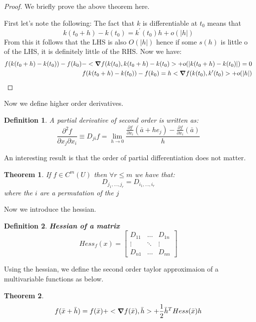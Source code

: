 \documentclass[titlepage]{article}
\newtheorem{theorem}{Theorem}[section]
\newtheorem{definition}{Definition}
\begin{document}
\begin{proof}
We briefly prove the above theorem here.

First let's note the following:
The fact that $k$ is differentiable at $t_{0}$ means that 
$$k(t_{0}+h) - k(t_{0}) = k^{\prime}(t_{0})h + o(|h|) $$ From this it follows that the LHS is also $O(|h|)$ hence if some $s(h)$ is little o of the LHS, it is definitely little of the RHS. Now we have:
\begin{align*}
    f(k(t_{0}+h) - k(t_{0})) - f(k_{0}) - <\grad f(k(t_{0}),k(t_{0}+h) - k(t_{0})> + o(|k(t_{0}+h) - k(t_{0})|) = 0\\
     f(k(t_{0}+h) - k(t_{0})) - f(k_{0}) = h<\grad f(k(t_{0}),k^{\prime}(t_{0})> + o(|h|)
\end{align*}
\end{proof}

Now we define higher order derivatives. 
\begin{definition}
A partial derivative of second order is written as:
$$\frac{\partial^{2}f}{\partial x_{j} \partial x_{i}} \equiv D_{ji}f = \lim_{h\to 0}\frac{\frac{\partial f}{\partial x_{i}}(\bar{a} + he_{j}) - \frac{\partial f}{\partial x_{i}}(\bar{a})}{h} $$
\end{definition}

An interesting result is that the order of partial differentiation does not matter.
\begin{theorem}
If $f \in C^{m}(U)$ then $\forall r \leq m$ we have that:
$$D_{j_{1},\ldots, j_{r}} = D_{i_{1},\ldots, i_{r}} $$ where the $i$ are a permutation of the $j$
\end{theorem}

Now we introduce the hessian. 

\begin{definition}\textbf{Hessian of a matrix}
$$ Hess_{f}(x) = 
\begin{bmatrix}
 D_{11} & \ldots & D_{1n}\\
 \vdots & \ddots & \vdots\\
 D_{n1} & \ldots & D_{nn}
\end{bmatrix}
$$
\end{definition}

Using the hessian, we define the second order taylor approximaion of a multivariable functions as below.

\begin{theorem}
$$f(\bar{x}+\bar{h}) = f(\bar{x}) + <\grad f(\bar{x}),\bar{h}> + \frac{1}{2} \bar{h}^{T} Hess(\bar{x})h$$
\end{theorem}
\end{document}
